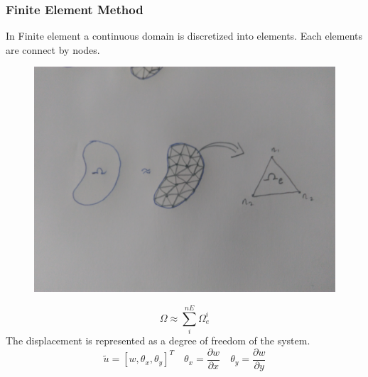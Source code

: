 \documentclass[9pt]{beamer}
\begin{document}
\begin{frame}
\frametitle{Finite Element Method}
In Finite element a  continuous domain is discretized into elements. Each elements are connect by nodes.   
\begin{figure}[h!]
\centering
{}%
  \includegraphics[width=\linewidth,trim={10cm 30cm 8cm 30cm},clip]{FEM.jpg}
\endminipage
\end{figure} 
\begin{equation*}
\Omega \approx \sum_{i}^{nE} \Omega_e^i
\end{equation*}
The displacement is represented as a degree of freedom of the system.
\begin{equation*}
\tilde{u} = \left[ w, \theta_x , \theta_y  \right]^T \quad \theta_x=\frac{\partial w}{\partial x} \quad \theta_y=\frac{\partial w}{\partial y}
\end{equation*}
\end{frame}
\end{document}
